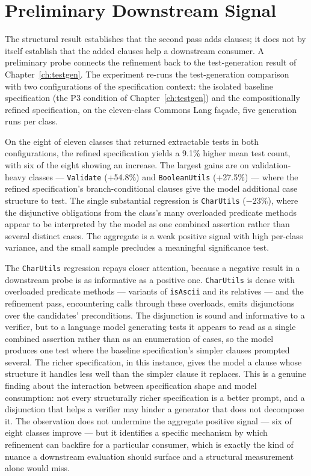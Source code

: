 \section{Preliminary Downstream Signal}
\label{sec:comp-downstream}

The structural result establishes that the second pass adds clauses; it does not
by itself establish that the added clauses help a downstream consumer. A
preliminary probe connects the refinement back to the test-generation result of
Chapter~\ref{ch:testgen}. The experiment re-runs the test-generation comparison
with two configurations of the specification context: the isolated baseline
specification (the P3 condition of Chapter~\ref{ch:testgen}) and the
compositionally refined specification, on the eleven-class Commons Lang fa\c{c}ade,
five generation runs per class.

On the eight of eleven classes that returned extractable tests in both
configurations, the refined specification yields a 9.1\% higher mean test count,
with six of the eight showing an increase. The largest gains are on
validation-heavy classes --- \texttt{Validate} (+54.8\%) and \texttt{BooleanUtils}
(+27.5\%) --- where the refined specification's branch-conditional clauses give
the model additional case structure to test. The single substantial regression
is \texttt{CharUtils} ($-23\%$), where the disjunctive obligations from the
class's many overloaded predicate methods appear to be interpreted by the model
as one combined assertion rather than several distinct cases. The aggregate is a
weak positive signal with high per-class variance, and the small sample
precludes a meaningful significance test.

The \texttt{CharUtils} regression repays closer attention, because a negative
result in a downstream probe is as informative as a positive one. \texttt{CharUtils}
is dense with overloaded predicate methods --- variants of \texttt{isAscii} and its
relatives --- and the refinement pass, encountering calls through these overloads,
emits disjunctions over the candidates' preconditions. The disjunction is sound and
informative to a verifier, but to a language model generating tests it appears to
read as a single combined assertion rather than as an enumeration of cases, so the
model produces one test where the baseline specification's simpler clauses prompted
several. The richer specification, in this instance, gives the model a clause whose
structure it handles less well than the simpler clause it replaces. This is a
genuine finding about the interaction between specification shape and model
consumption: not every structurally richer specification is a better prompt, and a
disjunction that helps a verifier may hinder a generator that does not decompose it.
The observation does not undermine the aggregate positive signal --- six of eight
classes improve --- but it identifies a specific mechanism by which refinement can
backfire for a particular consumer, which is exactly the kind of nuance a downstream
evaluation should surface and a structural measurement alone would miss.

